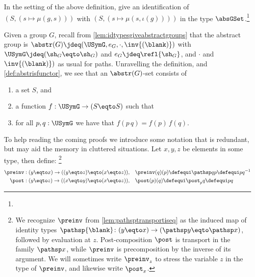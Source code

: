 \begin{xca}\label{xca:absprtorsor}
In the setting of the above definition,
give an identification of $(S,(s\mapsto \mu(g,s)))$ with
$(S,(s\mapsto \mu(s,\iota(g))))$
in the type $\absGSet$.\footnote{}
\end{xca}

\begin{example}
  Given a group $G$, recall from \cref{lem:idtypesgiveabstractgroups}
  that the abstract group is 
  $\abstr(G)\jdeq(\USymG,e_G,\cdot,\inv{(\blank)})$ 
  with $\USymG\jdeq(\sh_G\eqto\sh_G)$ and $e_G\jdeq\refl{\sh_G}$,
  and $\cdot$ and $\inv{(\blank)})$ as usual for paths.
  Unravelling the definition, and \cref{def:abstrisfunctor},
  we see that an $\abstr(G)$-set consists of
  \begin{enumerate}
  \item a set $S$, and
  \item a function $f:\USymG\to (S\eqto S)$ such that
  \item for all $p,q:\USymG$ we have that $f(p\, q)=f(p)\,f(q)$.\qedhere
  \end{enumerate}
\end{example}

To help reading the coming proofs we introduce some notation that is
redundant, but may aid the memory in cluttered situations.
Let $x,y,z$ be elements in some type, then define:%
\footnote{We recognize $\preinv$ from \cref{lem:pathsptransportiseq}
as the induced map of identity types $\pathsp{\blank}\colon (y\eqto x)
\to(\pathsp y \eqto \pathsp x)$, followed by evaluation at $z$.
Post-composition $\post$ is transport in the family $\pathsp x$,
while $\preinv$ is precomposition by the inverse of its argument.
We will sometimes write $\preinv_z$ to stress the variable $z$
in the type of $\preinv$, and likewise write $\post_x$.}
\begin{align*}
  \preinv:(y\eqto x)\to ((y\eqto z)\eqto (x\eqto z)),\quad&\preinv(q)(p)\defequi\pathsp qp\defequi pq^{-1}\\
  \post:(y\eqto z)\to ((x\eqto y)\eqto (x\eqto z)),\quad&\post(p)(q)\defequi\post_pq\defequi pq
\end{align*}

